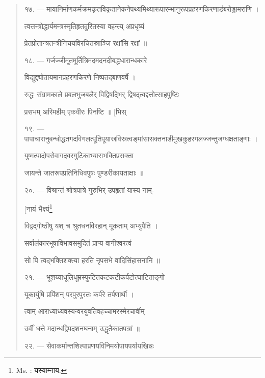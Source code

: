 \documentclass[a4paper, 11pt, oneside, french, landscape, twocolumn]{article}
\begin{document}
\begin{quotation}
\texthindi{१७}. --- \texthindi{मायानिर्माणकर्मक्रमकृतविकृतानेकनेपथ्यमिथ्यारूपारम्भानुरूपप्रहरणकिरणाडंबरोड्डामराणि ।}

\texthindi{त्वत्तन्त्रोद्धार्यमन्त्रस्मृतिहृतदुरितस्या वहन्त्य् अप्रधृष्यं}

\texthindi{प्रेतप्रोतान्त्रतन्त्रीनिचयविरचितस्राञ्जि रक्षांसि रक्षां ॥}

\bigskip

\texthindi{१८}. --- \texthindi{गर्जज्जीमूतमूर्तित्रिमदमदनदीबद्धधारान्धकारे}

\texthindi{विद्युद्द्योतायमानप्रहरणकिरणे निष्पतद्बाणवर्षे ।}

\texthindi{रुद्धः संग्रामकाले प्रबलभुजबलैर् विद्विषद्भिर् द्विषद्त्वद्दत्तोत्साहपुष्टिः}

\texthindi{प्रसभम् अरिमहीम् एकवीरः पिनष्टि ॥ [भिस्}

\bigskip

\texthindi{१९}. --- \texthindi{पापाचारानुबन्धोद्धतगदविगलत्पूतिपूयास्रविस्रत्वङ्मांसासक्तनाडीमुखकुहरगलज्जन्तुजग्धक्षताङ्गाः ।}

\texthindi{युष्मत्पादोपसेवागदवरगुटिकाभ्यासभक्तिप्रसक्ता}

\texthindi{जायन्ते जातरूपप्रतिनिधिवपुषः पुण्डरीकायताक्षाः ॥}

\bigskip

\texthindi{२०}. --- \texthindi{विश्रान्तं श्रोत्रपात्रे गुरुभिर् उपहृतां यास्य नाम्-}

\hspace*{55mm}\texthindi{[नायं भैक्ष्यं}\footnote{Ms. : \texthindi{यस्याम्नाय.}}

\texthindi{विद्वद्गोष्ठीषु यश् च श्रुतधनविरहान् मूकताम् अभ्युपैति ।}

\texthindi{सर्वालंकारभूषाविभावसमुदितं प्राप्य वागीश्वरत्वं}

\texthindi{सो पि त्वद्भक्तिशक्त्या हरति नृपसभे वादिसिंहासनानि ॥}

\bigskip

\texthindi{२१}. --- \texthindi{भूशय्याधूलिधूम्रस्फुटितकटकटीकर्पटोत्घाटिताङ्गो}

\texthindi{यूकायुंषि प्रपिंशन् परपुरपुरतः कर्परे तर्पणार्थी ।}

\texthindi{त्वाम् आराध्याध्यवस्यन्वरयुवतिवहच्चामरस्मेरचार्वीम्}

\texthindi{उर्वीं धत्ते मदान्धद्विपदशनघनाम् उद्धृतैकातपत्रां ॥}

\bigskip

\texthindi{२२}. --- \texthindi{सेवाकर्मान्तशिल्पाप्रणयविनिमयोपायपर्यायखिन्नः}


\end{quotation}
\end{document}
